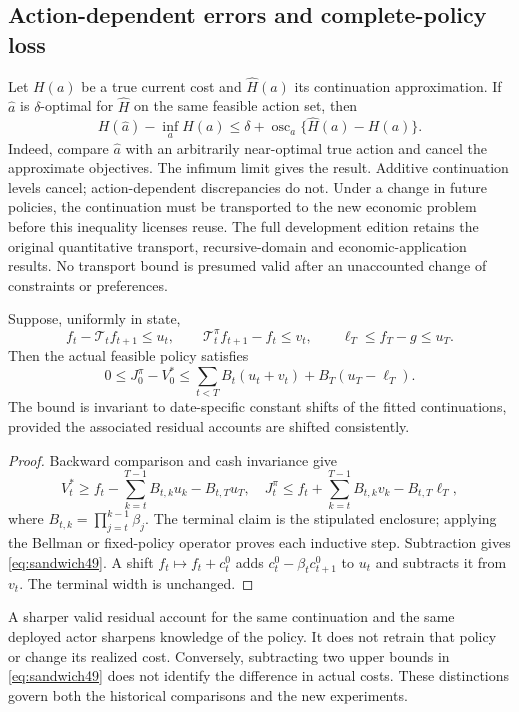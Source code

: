 \subsection{Action-dependent errors and complete-policy loss}
Let $H(a)$ be a true current cost and $\widehat H(a)$ its continuation approximation. If $\widehat a$ is $\delta$-optimal for $\widehat H$ on the same feasible action set, then
\begin{equation}\label{eq:center49}
 H(\widehat a)-\inf_aH(a)\le\delta+
 \operatorname{osc}_{a}\{\widehat H(a)-H(a)\}.
\end{equation}
Indeed, compare $\widehat a$ with an arbitrarily near-optimal true action and cancel the approximate objectives. The infimum limit gives the result. Additive continuation levels cancel; action-dependent discrepancies do not. Under a change in future policies, the continuation must be transported to the new economic problem before this inequality licenses reuse. The full development edition retains the original quantitative transport, recursive-domain and economic-application results. No transport bound is presumed valid after an unaccounted change of constraints or preferences.

\begin{proposition}\label{prop:sandwich49}
Suppose, uniformly in state,
\[
 f_t-\mathcal T_tf_{t+1}\le u_t,\qquad
 \mathcal T_t^\pi f_{t+1}-f_t\le v_t,
 \qquad \ell_T\le f_T-g\le u_T.
\]
Then the actual feasible policy satisfies
\begin{equation}\label{eq:sandwich49}
 0\le J_0^\pi-V_0^*\le
 \sum_{t<T}B_t(u_t+v_t)+B_T(u_T-\ell_T).
\end{equation}
The bound is invariant to date-specific constant shifts of the fitted continuations, provided the associated residual accounts are shifted consistently.
\end{proposition}
\begin{proof}
Backward comparison and cash invariance give
\[
 V_t^*\ge f_t-\sum_{k=t}^{T-1}B_{t,k}u_k-B_{t,T}u_T,
 \quad
 J_t^\pi\le f_t+\sum_{k=t}^{T-1}B_{t,k}v_k-B_{t,T}\ell_T,
\]
where $B_{t,k}=\prod_{j=t}^{k-1}\beta_j$. The terminal claim is the stipulated enclosure; applying the Bellman or fixed-policy operator proves each inductive step. Subtraction gives \eqref{eq:sandwich49}. A shift $f_t\mapsto f_t+c_t^0$ adds $c_t^0-\beta_tc_{t+1}^0$ to $u_t$ and subtracts it from $v_t$. The terminal width is unchanged.
\end{proof}

A sharper valid residual account for the same continuation and the same deployed actor sharpens knowledge of the policy. It does not retrain that policy or change its realized cost. Conversely, subtracting two upper bounds in \eqref{eq:sandwich49} does not identify the difference in actual costs. These distinctions govern both the historical comparisons and the new experiments.

